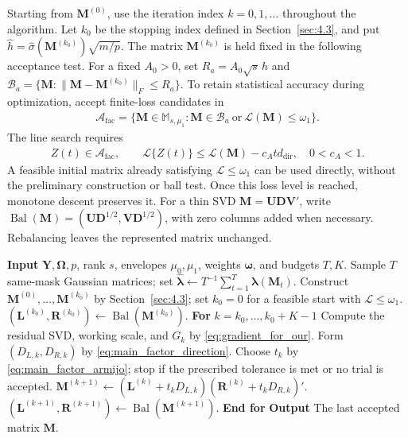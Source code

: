 \documentclass[numsec,webpdf,modern,large,namedate]{oup-authoring-template}
\theoremstyle{plain}
\theoremstyle{remark}
\newcommand{\M}{\bm{M}}
\newcommand{\Y}{\bm{Y}}
\newcommand{\bOmega}{\bm{\Omega}}
\newcommand{\U}{\bm{U}}
\newcommand{\V}{\bm{V}}
\newcommand{\bL}{\bm{L}}
\newcommand{\R}{\bm{R}}
\newif\ifmarkchanges
\newenvironment{revision}{\begingroup\ifmarkchanges\color{red}\fi}{\endgroup}
\DeclareRobustCommand{\revisionfloatcolor}{\ifmarkchanges\color{red}\fi}
\begin{document}
\begin{revision}
Starting from $\M^{(0)}$, use the iteration index $k=0,1,\ldots$
throughout the algorithm. Let $k_0$ be the stopping index defined in
Section~\ref{sec:4.3}, and put
$\widehat h=\widehat\sigma(\M^{(k_0)})\sqrt{m/p}$.
The matrix $\M^{(k_0)}$ is held fixed in the following acceptance test.
For a fixed $A_0>0$, set $R_a=A_0\sqrt s\,\widehat h$ and
$\mathcal B_a=\{\M:\|\M-\M^{(k_0)}\|_F\le R_a\}$.
To retain statistical accuracy during optimization, accept finite-loss
candidates in
\begin{align}
 \mathcal A_{\mathrm{fac}}=
 \{\M\in\mathbb M_{s,\mu_1}:\M\in\mathcal B_a
                         \ \text{or}\ \mathcal L(\M)\le\omega_1\}.
 \label{eq:main_factor_acceptance}
\end{align}
The line search requires
\begin{align}
 Z(t)\in\mathcal A_{\mathrm{fac}},\qquad
 \mathcal L\{Z(t)\}\le\mathcal L(\M)-c_A td_{\mathrm{dir}},
 \quad 0<c_A<1.
 \label{eq:main_factor_armijo}
\end{align}
A feasible initial matrix already satisfying $\mathcal L\le\omega_1$
can be used directly, without the preliminary construction or ball test.
Once this loss level is reached, monotone descent preserves it.
For a thin SVD $\M=\U\bm D\V'$, write
$\operatorname{Bal}(\M)=(\U\bm D^{1/2},\V\bm D^{1/2})$, with zero
columns added when necessary. Rebalancing leaves the represented matrix
unchanged.


\begin{algorithm}[htbp!]\revisionfloatcolor{}
\caption{Iteration Algorithm for $\widetilde{\M}_{\mathrm{fac}}$}
\label{alg:nonconvex}

\begin{algorithmic}[1]
\State \textbf{Input} $\Y,\bOmega,p$, rank $s$, envelopes $\mu_0,\mu_1$, weights
$\bm\omega$, and budgets $T,K$.
\State Sample $T$ same-mask Gaussian matrices; set
$\widehat{\bm\lambda}\leftarrow T^{-1}\sum_{t=1}^T\bm\lambda(\M_t)$.
\State Construct $\M^{(0)},\ldots,\M^{(k_0)}$ by Section~\ref{sec:4.3};
set $k_0=0$ for a feasible start with $\mathcal L\le\omega_1$.
\State $(\bL^{(k_0)},\R^{(k_0)})\leftarrow\operatorname{Bal}(\M^{(k_0)})$.
\State \textbf{For} $k=k_0,\ldots,k_0+K-1$
\State \quad Compute the residual SVD, working scale, and $G_k$ by
\eqref{eq:gradient_for_our}.
\State \quad Form $(D_{L,k},D_{R,k})$ by \eqref{eq:main_factor_direction}.
\State \quad Choose $t_k$ by \eqref{eq:main_factor_armijo}; stop if the
prescribed tolerance is met or no trial is accepted.
\State \quad $\M^{(k+1)}\leftarrow(\bL^{(k)}+t_kD_{L,k})
                         (\R^{(k)}+t_kD_{R,k})'$.
\State \quad $(\bL^{(k+1)},\R^{(k+1)})\leftarrow
                         \operatorname{Bal}(\M^{(k+1)})$.
\State \textbf{End for}
\State \textbf{Output} The last accepted matrix $\M$.
\end{algorithmic}


\end{algorithm}
\end{revision}
\end{document}
